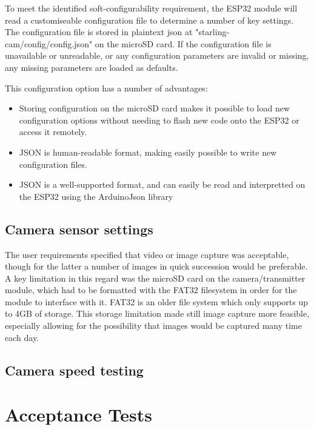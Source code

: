 To meet the identified soft-configurability requirement, the ESP32 module will read a customiseable configuration file to determine a number of key settings. The configuration file is stored in plaintext json at "starling-cam/config/config.json" on the microSD card. If the configuration file is unavailable or unreadable, or any configuration parameters are invalid or missing, any missing parameters are loaded as defaults.

This configuration option has a number of advantages:

\begin{itemize}
    \item Storing configuration on the microSD card makes it possible to load new configuration options without needing to flash new code onto the ESP32 or access it remotely.
    \item JSON is human-readable format, making easily possible to write new configuration files.
    \item JSON is a well-supported format, and can easily be read and interpretted on the ESP32 using the ArduinoJson library %
\end{itemize}

\subsection{Camera sensor settings}

The user requirements specified that video or image capture was acceptable, though for the latter a number of images in quick succession would be preferable. A key limitation in this regard was the microSD card on the camera/transmitter module, which had to be formatted with the FAT32 filesystem in order for the module to interface with it. FAT32 is an older file system which only supports up to 4GB of storage. This storage limitation made still image capture more feasible, especially allowing for the possibility that images would be captured many time each day.



\subsection{Camera speed testing}


\section{Acceptance Tests \label{s:firmware-atps}}

